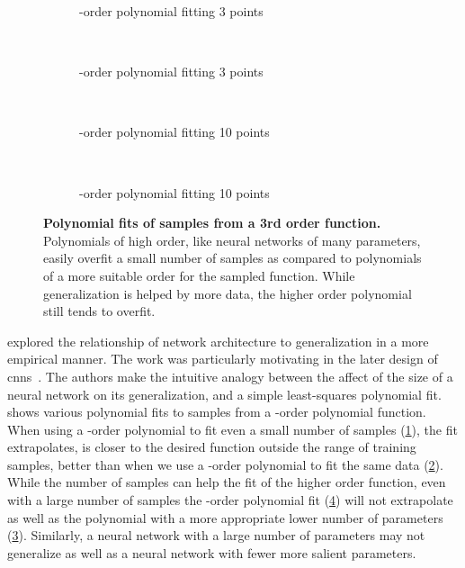 \documentclass[thesis]{subfiles}
\begin{document}
	\begin{figure}[tb]
		\centering
		\begin{subfigure}[t]{0.49\textwidth}
			\resizebox{\linewidth}{!}{}
			\caption{-order polynomial fitting 3 points}
			\label{fig:polyfit3rd}
		\end{subfigure}
		~
		\begin{subfigure}[t]{0.49\textwidth}
			\resizebox{\linewidth}{!}{}
			\caption{-order polynomial fitting 3 points}
			\label{fig:polyfit20th}
		\end{subfigure}\\	
		\begin{subfigure}[t]{0.49\textwidth}
			\resizebox{\linewidth}{!}{}
			\caption{-order polynomial fitting 10 points}
			\label{fig:polyfit3rdlots}
		\end{subfigure}
		~
		\begin{subfigure}[t]{0.49\textwidth}
			\resizebox{\linewidth}{!}{}
			\caption{-order polynomial fitting 10 points}
			\label{fig:polyfit20thlots}
		\end{subfigure}
		\caption[Polynomial fits of samples from a 3rd order function]{\textbf{Polynomial fits of samples from a 3rd order function.} Polynomials of high order, like neural networks of many parameters, easily overfit a small number of samples as compared to polynomials of a more suitable order for the sampled function. While generalization is helped by more data, the higher order polynomial still tends to overfit.}
		\label{fig:polyfits}
	\end{figure}

	\citet{denker1987large} explored the relationship of network architecture to generalization in a more empirical manner. The work was particularly motivating in the later design of \glspl{cnn}~\citep{lecun1989generalization, lecun1989backpropagation}. The authors make the intuitive analogy between the affect of the size of a neural network on its generalization, and a simple least-squares polynomial fit.  shows various polynomial fits to samples from a -order polynomial function. When using a -order polynomial to fit even a small number of samples (\cref{fig:polyfit3rd}), the fit extrapolates, \ie is closer to the desired function outside the range of training samples, better than when we use a -order polynomial to fit the same data (\cref{fig:polyfit20th}). While the number of samples can help the fit of the higher order function, even with a large number of samples the -order polynomial fit  (\cref{fig:polyfit20thlots}) will not extrapolate as well as the polynomial with a more appropriate lower number of parameters (\cref{fig:polyfit3rdlots}). Similarly, a neural network with a large number of parameters may not generalize as well as a neural network with fewer more salient parameters.
    
\end{document}
